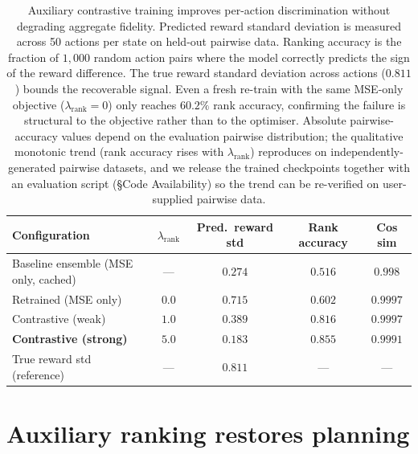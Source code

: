 \documentclass[11pt]{article}
\begin{document}
\begin{table}[htbp]
\centering
\small
\caption{Auxiliary contrastive training improves per-action discrimination without degrading aggregate fidelity. Predicted reward standard deviation is measured across 50 actions per state on held-out pairwise data. Ranking accuracy is the fraction of $1{,}000$ random action pairs where the model correctly predicts the sign of the reward difference. The true reward standard deviation across actions ($0.811$) bounds the recoverable signal. Even a fresh re-train with the same MSE-only objective ($\lambda_{\text{rank}}{=}0$) only reaches $60.2\%$ rank accuracy, confirming the failure is structural to the objective rather than to the optimiser. Absolute pairwise-accuracy values depend on the evaluation pairwise distribution; the qualitative monotonic trend (rank accuracy rises with $\lambda_{\text{rank}}$) reproduces on independently-generated pairwise datasets, and we release the trained checkpoints together with an evaluation script (\S Code Availability) so the trend can be re-verified on user-supplied pairwise data.}
\label{tab:contrastive-disc}
\begin{tabular}{lcccc}
\toprule
Configuration & $\lambda_{\text{rank}}$ & Pred.\ reward std & Rank accuracy & Cos sim \\
\midrule
Baseline ensemble (MSE only, cached) & --- & $0.274$ & $0.516$ & $0.998$ \\
Retrained (MSE only)                  & $0.0$ & $0.715$ & $0.602$ & $0.9997$ \\
Contrastive (weak)                    & $1.0$ & $0.389$ & $0.816$ & $0.9997$ \\
\textbf{Contrastive (strong)}         & $\mathbf{5.0}$ & $0.183$ & $\mathbf{0.855}$ & $\mathbf{0.9991}$ \\
\midrule
True reward std (reference)           & --- & $0.811$ & --- & --- \\
\bottomrule
\end{tabular}
\end{table}

\section{Auxiliary ranking restores planning}\label{sec:fix}
\end{document}
